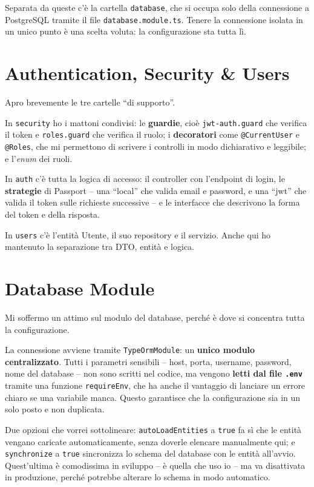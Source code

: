 \documentclass[11pt]{article}
\begin{document}
Separata da queste c'è la cartella \texttt{database}, che si occupa solo della
connessione a PostgreSQL tramite il file \texttt{database.module.ts}. Tenere la
connessione isolata in un unico punto è una scelta voluta: la configurazione sta tutta lì.

\section*{Authentication, Security \& Users}

Apro brevemente le tre cartelle ``di supporto''.

In \texttt{security} ho i mattoni condivisi: le \textbf{guardie}, cioè
\texttt{jwt-auth.guard} che verifica il token e \texttt{roles.guard} che verifica il
ruolo; i \textbf{decoratori} come \texttt{@CurrentUser} e \texttt{@Roles}, che mi
permettono di scrivere i controlli in modo dichiarativo e leggibile; e l'\emph{enum}
dei ruoli.

In \texttt{auth} c'è tutta la logica di accesso: il controller con l'endpoint di login,
le \textbf{strategie} di Passport -- una ``local'' che valida email e password, e una
``jwt'' che valida il token sulle richieste successive -- e le interfacce che descrivono
la forma del token e della risposta.

In \texttt{users} c'è l'entità Utente, il suo repository e il servizio. Anche qui ho
mantenuto la separazione tra DTO, entità e logica.

\section*{Database Module}

Mi soffermo un attimo sul modulo del database, perché è dove si concentra tutta la
configurazione.

La connessione avviene tramite \texttt{TypeOrmModule}: un \textbf{unico modulo
centralizzato}. Tutti i parametri sensibili -- host, porta, username, password, nome del
database -- non sono scritti nel codice, ma vengono \textbf{letti dal file \texttt{.env}}
tramite una funzione \texttt{requireEnv}, che ha anche il vantaggio di lanciare un errore
chiaro se una variabile manca. Questo garantisce che la configurazione sia in un solo
posto e non duplicata.

Due opzioni che vorrei sottolineare: \texttt{autoLoadEntities} a \texttt{true} fa sì che
le entità vengano caricate automaticamente, senza doverle elencare manualmente qui;
e \texttt{synchronize} a \texttt{true} sincronizza lo schema del database con le entità
all'avvio. Quest'ultima è comodissima in sviluppo -- è quella che uso io -- ma va
disattivata in produzione, perché potrebbe alterare lo schema in modo automatico.
\end{document}
